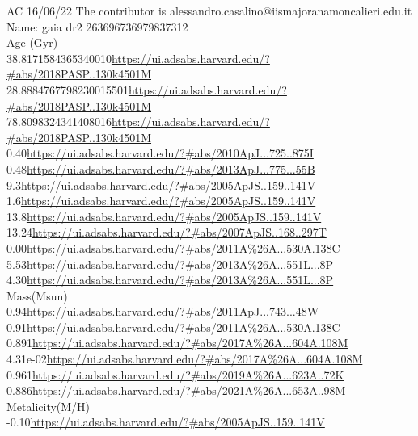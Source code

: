 AC 16/06/22 The contributor is alessandro.casalino@iismajoranamoncalieri.edu.it
Name: gaia dr2 263696736979837312\\
Age (Gyr)\\
38.8171584365340010\url{https://ui.adsabs.harvard.edu/?#abs/2018PASP..130k4501M}\\
28.8884767798230015501\url{https://ui.adsabs.harvard.edu/?#abs/2018PASP..130k4501M}\\
78.8098324341408016\url{https://ui.adsabs.harvard.edu/?#abs/2018PASP..130k4501M}\\
0.40\url{https://ui.adsabs.harvard.edu/?#abs/2010ApJ...725..875I}\\
0.48\url{https://ui.adsabs.harvard.edu/?#abs/2013ApJ...775...55B}\\
9.3\url{https://ui.adsabs.harvard.edu/?#abs/2005ApJS..159..141V}\\
1.6\url{https://ui.adsabs.harvard.edu/?#abs/2005ApJS..159..141V}\\
13.8\url{https://ui.adsabs.harvard.edu/?#abs/2005ApJS..159..141V}\\
13.24\url{https://ui.adsabs.harvard.edu/?#abs/2007ApJS..168..297T}\\
0.00\url{https://ui.adsabs.harvard.edu/?#abs/2011A%26A...530A.138C}\\
5.53\url{https://ui.adsabs.harvard.edu/?#abs/2013A%26A...551L...8P}\\
4.30\url{https://ui.adsabs.harvard.edu/?#abs/2013A%26A...551L...8P}\\

Mass(Msun)\\
0.94\url{https://ui.adsabs.harvard.edu/?#abs/2011ApJ...743...48W}\\
0.91\url{https://ui.adsabs.harvard.edu/?#abs/2011A%26A...530A.138C}\\
0.891\url{https://ui.adsabs.harvard.edu/?#abs/2017A%26A...604A.108M}\\
4.31e-02\url{https://ui.adsabs.harvard.edu/?#abs/2017A%26A...604A.108M}\\

0.961\url{https://ui.adsabs.harvard.edu/?#abs/2019A%26A...623A..72K}\\
0.886\url{https://ui.adsabs.harvard.edu/?#abs/2021A%26A...653A..98M}\\

Metalicity(M/H)\\
-0.10\url{https://ui.adsabs.harvard.edu/?#abs/2005ApJS..159..141V}\\

